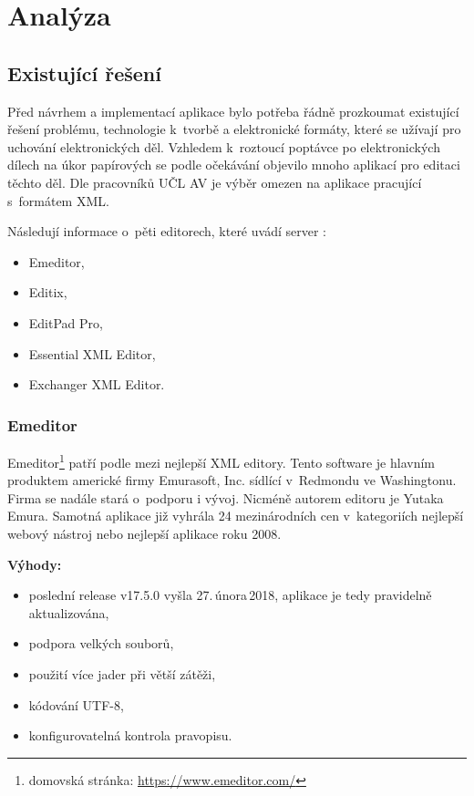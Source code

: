 \chapter{Analýza}

    \section{Existující řešení}
        Před návrhem a implementací aplikace bylo potřeba řádně prozkoumat existující řešení problému, technologie k~tvorbě a elektronické formáty, které se užívají pro uchování elektronických děl. Vzhledem k~roztoucí poptávce po elektronických dílech na úkor papírových se podle očekávání objevilo mnoho aplikací pro editaci těchto děl. Dle pracovníků UČL AV je výběr omezen na aplikace pracující s~formátem XML.
        
        Následují informace o~pěti editorech, které uvádí server \cite{tei-wiki}:
        \begin{itemize}
            \item Emeditor,
            \item Editix,
            \item EditPad Pro,
            \item Essential XML Editor,
            \item Exchanger XML Editor.
        \end{itemize}

        \subsection{Emeditor}
            Emeditor\footnote{domovská stránka: \url{https://www.emeditor.com/}} patří podle \cite{tei-wiki} mezi nejlepší XML editory. Tento software je hlavním produktem americké firmy Emurasoft, Inc. sídlící v~Redmondu ve Washingtonu. Firma se nadále stará o~podporu i vývoj. Nicméně autorem editoru je Yutaka Emura. Samotná aplikace již vyhrála 24 mezinárodních cen v~kategoriích nejlepší webový nástroj nebo nejlepší aplikace roku 2008. 
            
            \textbf{Výhody:}
                \begin{itemize}
                    \item poslední release v17.5.0 vyšla 27.\,února\,2018, aplikace je tedy pravidelně aktualizována,
                    \item podpora velkých souborů,
                    \item použití více jader při větší zátěži,
                    \item kódování UTF-8,
                    \item konfigurovatelná kontrola pravopisu.
                \end{itemize}
                
